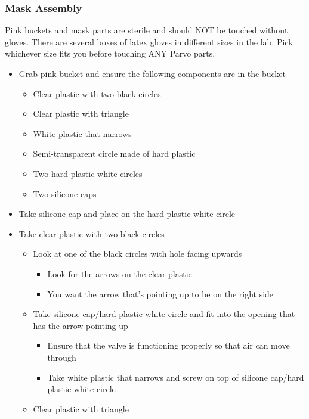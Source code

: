 \documentclass[
]{book}
\providecommand{\tightlist}{%
  \setlength{\itemsep}{0pt}\setlength{\parskip}{0pt}}
\begin{document}
\hypertarget{Appendix-Instruments-Parvo-Usage-MaskAssembly}{%
\subsubsection{Mask Assembly}\label{Appendix-Instruments-Parvo-Usage-MaskAssembly}}

Pink buckets and mask parts are sterile and should NOT be touched without gloves. There are several boxes of latex gloves in different sizes in the lab. Pick whichever size fits you before touching ANY Parvo parts.

\begin{itemize}
\tightlist
\item
  Grab pink bucket and ensure the following components are in the bucket

  \begin{itemize}
  \tightlist
  \item
    Clear plastic with two black circles
  \item
    Clear plastic with triangle
  \item
    White plastic that narrows
  \item
    Semi-transparent circle made of hard plastic
  \item
    Two hard plastic white circles
  \item
    Two silicone caps
  \end{itemize}
\item
  Take silicone cap and place on the hard plastic white circle
\item
  Take clear plastic with two black circles

  \begin{itemize}
  \tightlist
  \item
    Look at one of the black circles with hole facing upwards

    \begin{itemize}
    \tightlist
    \item
      Look for the arrows on the clear plastic
    \item
      You want the arrow that's pointing up to be on the right side
    \end{itemize}
  \item
    Take silicone cap/hard plastic white circle and fit into the opening that has the arrow pointing up

    \begin{itemize}
    \tightlist
    \item
      Ensure that the valve is functioning properly so that air can move through
    \item
      Take white plastic that narrows and screw on top of silicone cap/hard plastic white circle
    \end{itemize}
  \item
    Clear plastic with triangle


\end{itemize}
\end{itemize}
\end{document}

